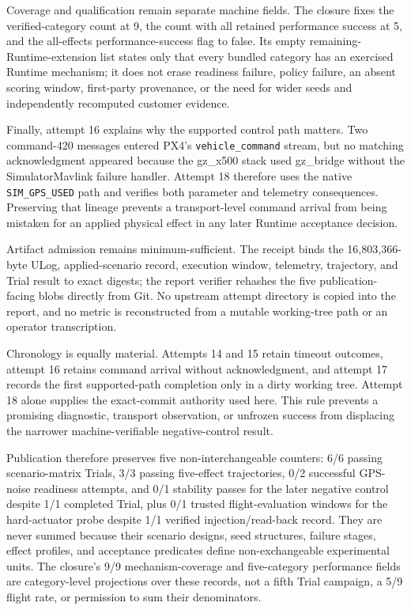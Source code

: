 Coverage and qualification remain separate machine fields. The closure fixes
the verified-category count at 9, the count with all retained performance
success at 5, and the all-effects performance-success flag to false. Its empty
remaining-Runtime-extension list states only that every bundled category has an
exercised Runtime mechanism; it does not erase readiness failure, policy
failure, an absent scoring window, first-party provenance, or the need for
wider seeds and independently recomputed customer evidence.

Finally, attempt 16 explains why the supported control path matters. Two
command-420 messages entered PX4's \texttt{vehicle\_command} stream, but
no matching acknowledgment appeared because the gz\_x500 stack used
gz\_bridge without the SimulatorMavlink failure handler. Attempt 18
therefore uses the native \texttt{SIM\_GPS\_USED} path and verifies both
parameter and telemetry consequences. Preserving that lineage prevents a
transport-level command arrival from being mistaken for an applied physical
effect in any later Runtime acceptance decision.

Artifact admission remains minimum-sufficient. The receipt binds the
16,803,366-byte ULog, applied-scenario record, execution window, telemetry,
trajectory, and Trial result to exact digests; the report verifier rehashes
the five publication-facing blobs directly from Git. No upstream attempt
directory is copied into the report, and no metric is reconstructed from a
mutable working-tree path or an operator transcription.

Chronology is equally material. Attempts 14 and 15 retain timeout outcomes,
attempt 16 retains command arrival without acknowledgment, and attempt 17
records the first supported-path completion only in a dirty working tree.
Attempt 18 alone supplies the exact-commit authority used here. This rule
prevents a promising diagnostic, transport observation, or unfrozen success
from displacing the narrower machine-verifiable negative-control result.

Publication therefore preserves five non-interchangeable counters: 6/6
passing scenario-matrix Trials, 3/3 passing five-effect trajectories, 0/2
successful GPS-noise readiness attempts, and 0/1 stability passes for the
later negative control despite 1/1 completed Trial, plus 0/1 trusted
flight-evaluation windows for the hard-actuator probe despite 1/1 verified
injection/read-back record. They are never summed
because their scenario designs, seed structures, failure stages, effect
profiles, and acceptance predicates define non-exchangeable experimental units.
The closure's 9/9 mechanism-coverage and five-category performance fields
are category-level projections over these records, not a fifth Trial
campaign, a 5/9 flight rate, or permission to sum their denominators.

